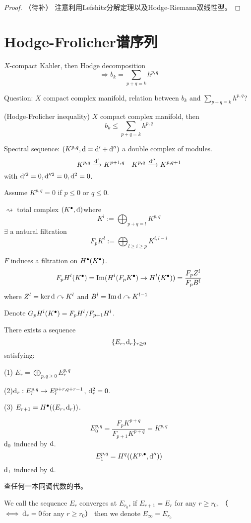 \begin{proof}
{\color{red}（待补）}
注意利用Lefshitz分解定理以及Hodge-Riemann双线性型。
\end{proof}

\section{Hodge-Frolicher谱序列}
$X$-compact Kahler, then Hodge decomposition
$$\Rightarrow b_k=\sum_{p+q=k}h^{p,q}$$

Question: $X$ compact complex manifold, relation between
$b_k$ and $\sum\limits_{p+q=k}h^{p,q}$?

\begin{thm}(Hodge-Frolicher inequality)
$X$ compact complex manifold, then
$$b_k\leq\sum_{p+q=k} h^{p,q}$$
\end{thm}

Spectral sequence:
$(K^{p,q},\mathrm{d}=\mathrm{d}'+\mathrm{d}'')$ a double complex of modules.
$$K^{p,q}\xrightarrow{\mathrm{d}'}K^{p+1,q}\quad
K^{p,q}\xrightarrow{\mathrm{d}''}K^{p,q+1}$$
with $\mathrm{d}'^2=0,\mathrm{d}''^2=0,\mathrm{d}^2=0$.

Assume $K^{p,q}=0$ if $p\leq 0$ or $q\leq 0$.

$\rightsquigarrow$ total complex $(K^{\bullet},\mathrm{d})$where
$$K^l:=\bigoplus_{p+q=l}K^{p,q}$$
$\exists$ a natural filtration
$$F_pK^l:=\bigoplus_{l\geq i\geq p}K^{i,l-i}$$

$F$ induces a filtration on $H^{\bullet}(K^{\bullet})$.
$$F_pH^l(K^{\bullet})=\operatorname{Im}(H^l(F_pK^{\bullet})\to H^l(K^{\bullet}))
=\frac{F_p Z^l}{F_p B^l}$$
where $Z^l=\ker \mathrm{d}\curvearrowright K^l$ and $B^l=\operatorname{Im}\mathrm{d}\curvearrowright K^{l-1}$

Denote $G_pH^l(K^{\bullet})=F_pH^l/F_{p+1}H^l$.

\begin{thm}There exists a sequence
$$\{E_r,\mathrm{d}_r\}_{r\geq 0}$$
satisfying:

(1) $E_r=\bigoplus\limits_{p,q\geq 0}E_r^{p,q}$

(2)$\mathrm{d}_r:E_r^{p,q}\to E_r^{p+r,q+r-1}$, $\mathrm{d}_r^2=0$.

(3) $E_{r+1}=H^{\bullet}((E_r,\mathrm{d}_r))$.

\end{thm}

$$E_0^{p,q}=\frac{F_p K^{p+q}}{F_{p+1}K^{p+q}}=K^{p,q}$$
$\mathrm{d}_0$ induced by $\mathrm{d}$.
$$E_1^{p,q}=H^q((K^{p,\bullet},\mathrm{d}''))$$
$\mathrm{d}_1$ induced by $\mathrm{d}$.

查任何一本同调代数的书。

\begin{definition}
We call the sequence ${E_r}$ converges at $E_{r_0}$,
if $E_{r+1}=E_r$ for any $r\geq r_0$,
（$\iff\mathrm{d}_r=0$for any $r\geq r_0$）
then we denote $E_\infty=E_{r_0}$
\end{definition}

